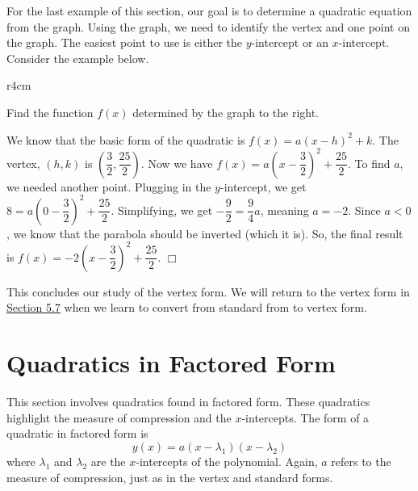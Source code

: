 \documentclass[../book.tex]{subfiles}
\begin{document}
For the last example of this section, our goal is to determine a quadratic equation from the graph.  Using the graph, we need to identify the vertex and one point on the graph.  The easiest point to use is either the $y$-intercept or an $x$-intercept.  Consider the example below.
\begin{wrapfigure}{r}{4cm}
\end{wrapfigure}
\begin{example}
Find the function $f(x)$ determined by the graph to the right.
\end{example}
\begin{solution}
We know that the basic form of the quadratic is $f(x)=a(x-h)^2+k$.  The vertex, $(h,k)$ is $\left(\dfrac{3}{2},\dfrac{25}{2}\right)$.  Now we have $f(x)=a\left(x-\dfrac{3}{2}\right)^2+\dfrac{25}{2}$.  To find $a$, we needed another point.  Plugging in the $y$-intercept, we get $8=a\left(0-\dfrac{3}{2}\right)^2+\dfrac{25}{2}$.  Simplifying, we get $-\dfrac{9}{2}=\dfrac{9}{4}a$, meaning $a=-2$.  Since $a<0$, we know that the parabola should be inverted (which it is).  So, the final result is $f(x)=-2\left(x-\dfrac{3}{2}\right)^2+\dfrac{25}{2}$.  $\Box$
\end{solution}
This concludes our study of the vertex form.  We will return to the vertex form in \hyperlink{section.5.7}{Section 5.7} when we learn to convert from standard from to vertex form.  
\section{Quadratics in Factored Form}
This section involves quadratics found in factored form.  These quadratics highlight the measure of compression and the $x$-intercepts.  The form of a quadratic in factored form is $$y(x)=a(x-\lambda_1)(x-\lambda_2)$$ where $\lambda_1$ and $\lambda_2$ are the $x$-intercepts of the polynomial.  Again, $a$ refers to the measure of compression, just as in the vertex and standard forms.  
\end{document}
